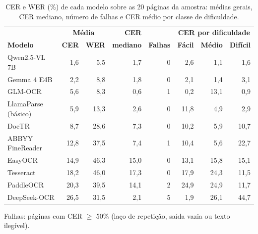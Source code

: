 \begin{table}[htb]
\centering
\caption{CER e WER (\%) de cada modelo sobre as 20 páginas da amostra:
médias gerais, CER mediano, número de falhas e CER médio por classe de dificuldade.}
\label{tab:avaliacao_resumo}
\renewcommand{\arraystretch}{1.25}
{\small
\begin{tabular}{l r r r r r r r}
\hline
& \multicolumn{2}{c}{\textbf{Média}} & \textbf{CER} & & \multicolumn{3}{c}{\textbf{CER por dificuldade}} \\
\textbf{Modelo} & \textbf{CER} & \textbf{WER} & \textbf{mediano} & \textbf{Falhas} & \textbf{Fácil} & \textbf{Médio} & \textbf{Difícil} \\
\hline
Qwen2.5-VL 7B & 1,6 & 5,5 & 1,7 & 0 & 2,6 & 1,1 & 1,6 \\
Gemma 4 E4B & 2,2 & 8,8 & 1,8 & 0 & 2,1 & 1,4 & 3,1 \\
GLM-OCR & 5,6 & 8,3 & 0,6 & 1 & 0,2 & 13,1 & 0,9 \\
LlamaParse (básico) & 5,9 & 13,3 & 2,6 & 0 & 11,8 & 4,9 & 2,9 \\
DocTR & 8,7 & 28,6 & 7,3 & 0 & 10,2 & 5,9 & 10,7 \\
ABBYY FineReader & 12,8 & 37,5 & 7,4 & 1 & 10,4 & 5,6 & 22,7 \\
EasyOCR & 14,9 & 46,3 & 15,0 & 0 & 13,1 & 15,8 & 15,1 \\
Tesseract & 18,2 & 46,0 & 17,3 & 0 & 17,9 & 24,3 & 11,5 \\
PaddleOCR & 20,3 & 39,5 & 14,1 & 2 & 24,9 & 24,9 & 11,7 \\
DeepSeek-OCR & 26,5 & 31,5 & 2,1 & 5 & 1,9 & 26,1 & 44,7 \\
\hline
\end{tabular}
}
\par\footnotesize{Falhas: páginas com CER $\geq$ 50\% (laço de repetição, saída vazia ou texto ilegível).}
\end{table}

